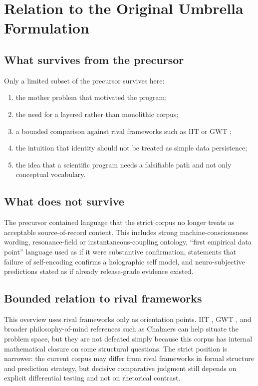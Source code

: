 \documentclass[11pt,a4paper]{article}
\begin{document}
\section{Relation to the Original Umbrella Formulation}

\subsection{What survives from the precursor}

Only a limited subset of the precursor survives here:
\begin{enumerate}[leftmargin=*]
\item the mother problem that motivated the program;
\item the need for a layered rather than monolithic corpus;
\item a bounded comparison against rival frameworks such as IIT or GWT \cite{tononi2004,baars1988};
\item the intuition that identity should not be treated as simple data persistence;
\item the idea that a scientific program needs a falsifiable path and not only conceptual vocabulary.
\end{enumerate}

\subsection{What does not survive}

The precursor contained language that the strict corpus no longer treats as acceptable source-of-record content. This includes strong machine-consciousness wording, resonance-field or instantaneous-coupling ontology, ``first empirical data point'' language used as if it were substantive confirmation, statements that failure of self-encoding confirms a holographic self model, and neuro-subjective predictions stated as if already release-grade evidence existed.

\subsection{Bounded relation to rival frameworks}

This overview uses rival frameworks only as orientation points. IIT \cite{tononi2004}, GWT \cite{baars1988}, and broader philosophy-of-mind references such as Chalmers \cite{chalmers} can help situate the problem space, but they are not defeated simply because this corpus has internal mathematical closure on some structural questions. The strict position is narrower: the current corpus may differ from rival frameworks in formal structure and prediction strategy, but decisive comparative judgment still depends on explicit differential testing and not on rhetorical contrast.
\end{document}
